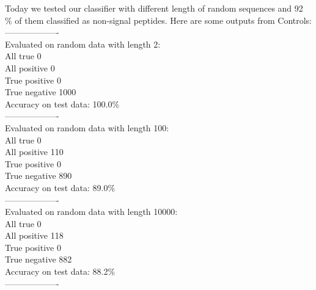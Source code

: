 \documentclass[a4paper]{tufte-handout}
\begin{document}
Today we tested our classifier with different length of random sequences and 92 \% of them classified as  non-signal peptides. Here are some outputs from Controls:
\\
-------------------\\
Evaluated on random data with length 2:\\
All true 0\\
All positive 0\\
True positive 0\\
True negative 1000\\
Accuracy on test data: 100.0\%\\
-------------------\\
Evaluated on random data with length 100:\\
All true 0 \\
All positive 110\\
True positive 0\\
True negative 890\\
Accuracy on test data: 89.0\% \\
-------------------\\
Evaluated on random data with length 10000:\\
All true 0\\
All positive 118\\
True positive 0\\
True negative 882\\
Accuracy on test data: 88.2\%\\
-------------------\\

\hrulefill



\end{document}

